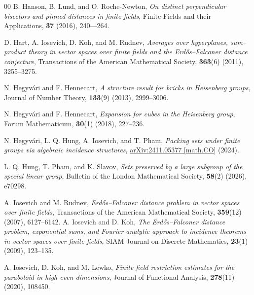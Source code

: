 \documentclass[11pt]{article}
\begin{document}
\begin{thebibliography}{00}
B. Hanson, B. Lund, and O. Roche-Newton,
\textit{On distinct perpendicular bisectors and pinned distances in finite fields}, Finite Fields and their Applications, \textbf{37} (2016), 240---264.

 D. Hart, A. Iosevich, D. Koh, and M. Rudnev, \textit{Averages over hyperplanes, sum--product theory in vector spaces over finite fields and the Erd\H{o}s--Falconer distance conjecture}, Transactions of the American Mathematical Society, \textbf{363}(6) (2011), 3255--3275.


N. Hegyv\'ari and F. Hennecart, \textit{A structure result for bricks in Heisenberg groups}, Journal of Number Theory, \textbf{133}(9) (2013), 2999--3006.

N. Hegyv\'ari and F. Hennecart, \textit{Expansion for cubes in the Heisenberg group}, Forum Mathematicum, \textbf{30}(1) (2018), 227--236. 



N. Hegyv\'ari, L. Q. Hung, A. Iosevich, and T. Pham,  \textit{Packing sets under finite groups via algebraic incidence structures}, 
\href{https://arxiv.org/abs/2411.05377}
{arXiv:2411.05377 [math.CO]} (2024).


L. Q. Hung, T. Pham, and K. Slavov, \textit{Sets preserved by a large subgroup of the special linear group},  Bulletin of the London Mathematical Society, \textbf{58}(2) (2026), e70298.








A. Iosevich and M. Rudnev, {\em Erd\H{o}s--Falconer   distance problem in vector spaces over finite fields}, Transactions of the American Mathematical Society, \textbf{359}(12) (2007), 6127--6142.
A. Iosevich and D. Koh, \textit{The Erd\H{o}s–Falconer distance problem, exponential sums, and Fourier analytic approach to incidence theorems in vector spaces over finite fields}, SIAM Journal on Discrete Mathematics, \textbf{23}(1) (2009), 123--135.


A. Iosevich, D. Koh, and  M. Lewko, \textit{Finite field restriction estimates for the paraboloid in high even dimensions}, Journal of Functional Analysis, \textbf{278}(11) (2020), 108450.


\end{thebibliography}
\end{document}
